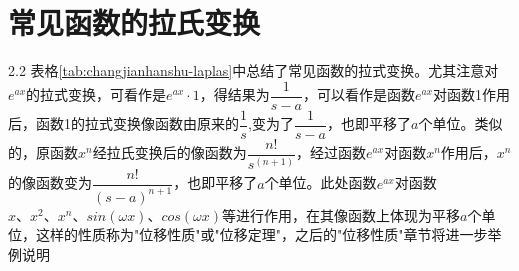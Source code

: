 \pagecolor{gray!7}
\chapter{常见函数的拉氏变换}

\begin{table}[H]
	\centering
	\caption{常见函数的拉氏变换速查表}
	\label{tab:changjianhanshu-laplas}
	\renewcommand{\arraystretch}{1.25}
\end{table}

\vspace{-10pt}

\begin{spacing}{2.2}
	表格\ref{tab:changjianhanshu-laplas}中总结了常见函数的拉式变换。尤其注意对$e^{ax}$的拉式变换，可看作是$e^{ax}\cdot1$，得结果为$\dfrac{1}{s-a}$，可以看作是函数$e^{ax}$对函数1作用后，函数1的拉式变换像函数由原来的$\dfrac{1}{s}$,变为了$\dfrac{1}{s-a}$，也即平移了$a$个单位。类似的，原函数$x^{n}$经拉氏变换后的像函数为$\dfrac{n!}{s^{\left(n+1\right)}}$，经过函数$e^{ax}$对函数$x^{n}$作用后，$x^{n}$的像函数变为$\dfrac{n!}{\left(s-a\right)^{n+1}}$，也即平移了$a$个单位。此处函数$e^{ax}$对函数$x、x^{2}、x^{n}、sin\left(\omega x\right)、cos\left(\omega x\right)$等进行作用，在其像函数上体现为平移$a$个单位，这样的性质称为"位移性质"或"位移定理"，之后的"位移性质"章节将进一步举例说明
\end{spacing}

